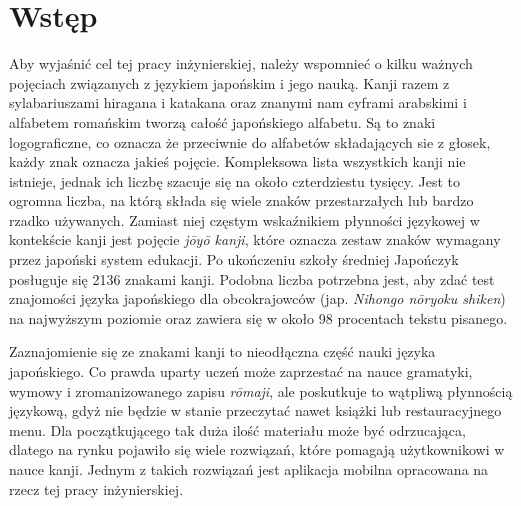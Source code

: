 \documentclass[a4paper,twoside,12pt]{book}
\newcounter{stronyPozaNumeracja}
\begin{document}
\tableofcontents

\setcounter{stronyPozaNumeracja}{\value{page}}
\mainmatter
\pagestyle{empty}

\cleardoublepage

\pagestyle{NumeryStronNazwyRozdzialow}


\chapter{Wstęp}
\label{ch:wstep}


Aby wyjaśnić cel tej pracy inżynierskiej, należy wspomnieć o kilku ważnych pojęciach związanych z językiem japońskim i jego nauką. Kanji razem z sylabariuszami hiragana i katakana oraz znanymi nam cyframi arabskimi i alfabetem romańskim tworzą całość japońskiego alfabetu. Są to znaki logograficzne, co oznacza że przeciwnie do alfabetów składających sie z głosek, każdy znak oznacza jakieś pojęcie. Kompleksowa lista wszystkich kanji nie istnieje, jednak ich liczbę szacuje się na około czterdziestu tysięcy. Jest to ogromna liczba, na którą składa się wiele znaków przestarzałych lub bardzo rzadko używanych. Zamiast niej częstym wskaźnikiem płynności językowej w kontekście kanji jest pojęcie \textit{jōyō kanji}, które oznacza zestaw znaków wymagany przez japoński system edukacji. Po ukończeniu szkoły średniej Japończyk posługuje się 2136 znakami kanji. Podobna liczba potrzebna jest, aby zdać test znajomości języka japońskiego dla obcokrajowców (jap. \textit{Nihongo nōryoku shiken}) na najwyższym poziomie oraz zawiera się w około 98 procentach tekstu pisanego.

Zaznajomienie się ze znakami kanji to nieodłączna część nauki języka japońskiego. Co prawda uparty uczeń może zaprzestać na nauce gramatyki, wymowy i zromanizowanego zapisu \textit{rōmaji}, ale poskutkuje to wątpliwą płynnością językową, gdyż nie będzie w stanie przeczytać nawet książki lub restauracyjnego menu. Dla początkującego tak duża ilość materiału może być odrzucająca, dlatego na rynku pojawiło się wiele rozwiązań, które pomagają użytkownikowi w nauce kanji. Jednym z takich rozwiązań jest aplikacja mobilna opracowana na rzecz tej pracy inżynierskiej.
\end{document}
